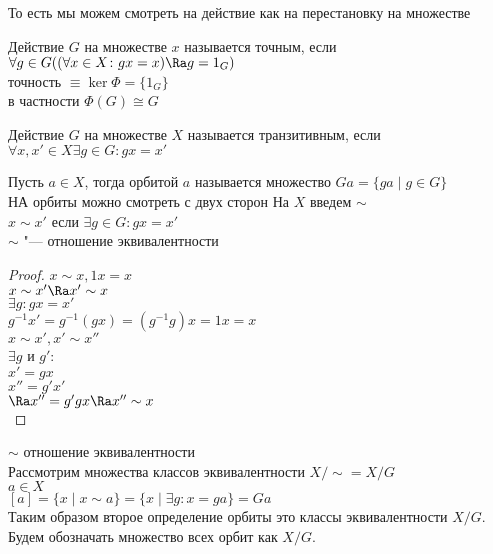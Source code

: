 То есть мы можем смотреть на действие как на перестановку на множестве\\

\begin{Def}
Действие $G$ на множестве $x$ называется точным, если 
$\forall g \in G ((\forall x \in X\colon gx = x) \Ra g = 1_{G})$\\
точность $\equiv \ker \Phi = \{1_G\}$\\
в частности $\Phi(G) \cong G$ \\
\end{Def}

\begin{Def}
Действие $G$ на множестве $X$ называется транзитивным, если 
$\forall x, x' \in X \exists g \in G \colon gx = x'$
\end{Def}
\begin{Def}
Пусть $a \in X$, тогда орбитой $a$ называется
множество $Ga = \{ga \mid g \in G\}$ \\

НА орбиты можно смотреть с двух сторон
На $X$ введем $\sim$\\
    $x \sim x'$ если $\exists g \in G \colon gx = x'$\\

$\sim$  "--- отношение эквивалентности\\
\end{Def}
\begin{proof}
$x \sim x, 1x = x$\\
$x \sim x' \Ra x' \sim x$\\
$\exists g \colon gx = x'$\\
$g^{-1}x' = g^{-1}(gx) = (g^{-1}g)x = 1x = x$\\

$x \sim x', x' \sim x''$\\
$\exists g$ и $g'$:\\
$x' = gx$\\
$x'' = g'x'$\\
$\Ra x'' = g'gx \Ra x'' \sim x$\\
\end{proof}
$\sim$ отношение эквивалентности\\
Рассмотрим множества классов эквивалентности $X / \sim = X / G$\\
$a \in X$\\
$[a] = \{x \mid x \sim a\} = \{x \mid \exists g \colon x = ga\} = Ga$ \\

Таким образом второе определение орбиты это классы эквивалентности $X/G$.
Будем обозначать множество всех орбит как $X/G$.

